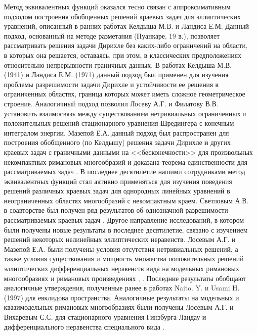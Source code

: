 \documentclass[a4paper,11pt,twoside]{article}
\begin{document}
	Метод эквивалентных функций оказался тесно связан с аппроксимативным подходом построения обобщенных решений краевых задач для эллиптических уравнений, описанный в ранних работах Келдыша М.В. и Ландиса Е.М. Данный подход, основанный на методе разметания (Пуанкаре, 19 в.), позволяет рассматривать решения задачи Дирихле без каких-либо ограничений на области, в которых она решается, оставаясь, при этом, в классических предположениях относительно непрерывности граничных данных. В работах Келдыша М.В. (1941) и Ландиса Е.М. (1971) данный подход был применен для изучения проблемы разрешимости задачи Дирихле и устойчивости ее решения в ограниченных областях, граница которых может иметь сложное геометрическое строение.  Аналогичный подход позволил Лосеву А.Г. и Филатову В.В. \cite{25} установить  взаимосвязь между существованием нетривиальных ограниченных и положительных решений стационарного уравнения Шредингера с конечным интегралом энергии. Мазепой Е.А. данный подход был распространен для построения обобщенного (по Келдышу) решения задачи Дирихле и других краевых задач с граничными данными на <<бесконечности>> для произвольных некомпактных римановых многообразий и доказана теорема единственности для рассматриваемых задач \cite{29}. В последнее десятилетие нашими сотрудниками  метод эквивалентных функций стал активно применяться для изучения поведения решений различных краевых задач для однородных линейных уравнений в неограниченных областях многообразий с некомпактным краем.  Светловым А.В. в соавторстве был получен ряд результатов об однозначной разрешимости рассматриваемых краевых задач \cite{62}.
	Другое направление исследований, в котором были получены новые результаты  в  последнее десятилетие, связано с  изучением  решений некоторых нелинейных эллиптических неравенств.  Лосевым А.Г. и Мазепой Е.А. были  получены условия отсутствия нетривиальных решений, а также условия существования и мощность множества положительных решений эллиптических дифференциальных  неравенств вида   на модельных римановых многообразиях и римановых произведениях \cite{30}, \cite{26}.
	Последние результаты обобщают аналогичные утверждения, полученные ранее в работах Naito. Y. и Usami H. (1997) для евклидова пространства. Аналогичные результаты на модельных и квазимодельных римановых многообразиях были получены Лосевым А.Г. и Вихаревым С.С. для стационарного уравнения Гинзбурга-Ландау и дифференциального неравенства специального вида \cite{2}. 
\end{document}
